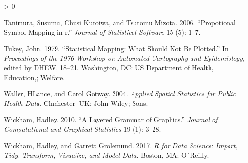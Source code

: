 \documentclass[
]{book}
\newlength{\cslhangindent}
\newenvironment{CSLReferences}[2] %
 {%
  \setlength{\parindent}{0pt}
  \ifodd #1 \everypar{\setlength{\hangindent}{\cslhangindent}}\ignorespaces\fi
  \ifnum #2 > 0
  \setlength{\parskip}{#2\baselineskip}
  \fi
 }%
 {}
\begin{document}
\begin{CSLReferences}{1}{0}
\leavevmode\hypertarget{ref-Tanimura_2006}{}%
Tanimura, Susumu, Chusi Kuroiwa, and Tsutomu Mizota. 2006. {``Propotional Symbol Mapping in r.''} \emph{Journal of Statistical Software} 15 (5): 1--7.

\leavevmode\hypertarget{ref-Tukey_1979}{}%
Tukey, John. 1979. {``Statistical Mapping: What Should Not Be Plotted.''} In \emph{Proceedings of the 1976 Workshop on Automated Cartography and Epidemiology}, edited by DHEW, 18--21. Washington, DC: US Department of Health, Education,; Welfare.

\leavevmode\hypertarget{ref-Waller_2004}{}%
Waller, HLance, and Carol Gotway. 2004. \emph{Applied Spatial Statistics for Public Health Data}. Chichester, UK: John Wiley; Sons.

\leavevmode\hypertarget{ref-Wickham_2010}{}%
Wickham, Hadley. 2010. {``A Layered Grammar of Graphics.''} \emph{Journal of Computational and Graphical Statistics} 19 (1): 3--28.

\leavevmode\hypertarget{ref-Wickham_2017}{}%
Wickham, Hadley, and Garrett Grolemund. 2017. \emph{R for Data Science: Import, Tidy, Transform, Visualize, and Model Data}. Boston, MA: O´Reilly.

\end{CSLReferences}
\end{document}
